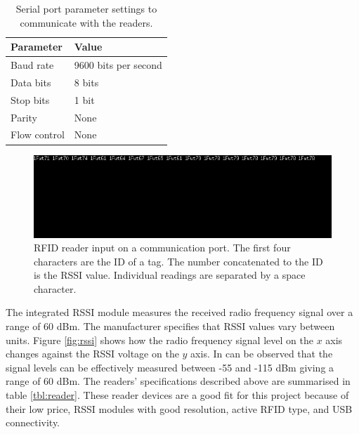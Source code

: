 \begin{table}[h]
	\centering
	\begin{tabular}{ | m{4cm} || m{4cm} | }
		\hline
		\textbf{Parameter}		& \textbf{Value} \\ \hline
		Baud rate				& 9600 bits per second \\ \hline
		Data bits				& 8 bits \\ \hline
		Stop bits				& 1 bit \\ \hline
		Parity					& None \\ \hline
		Flow control			& None \\ \hline
	\end{tabular}
	\caption{Serial port parameter settings to communicate with the readers.}
	\label{tbl:comm}
\end{table}

\begin{figure}[h]
	\begin{center}
		\includegraphics[width=1\textwidth]{figures/com}
		\caption{RFID reader input on a communication port. The first four characters are the ID of a tag. The number concatenated to the ID is the RSSI value. Individual readings are separated by a space character.}
		\label{fig:comm}
	\end{center}
\end{figure}

The integrated RSSI module measures the received radio frequency signal over a range of 60 dBm. The manufacturer specifies that RSSI values vary between units\footnotemark[2].  Figure \ref{fig:rssi} shows how the radio frequency signal level on the $x$ axis changes against the RSSI voltage on the $y$ axis. In can be observed that the signal levels can be effectively measured between -55 and -115 dBm giving a range of 60 dBm. The readers' specifications described above are summarised in table \ref{tbl:reader}. These reader devices are a good fit for this project because of their low price, RSSI modules with good resolution, active RFID type, and USB connectivity.

